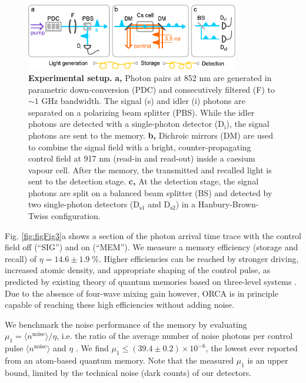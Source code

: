 \documentclass[12pt]{iopart}
\begin{document}
\begin{figure}[h!]
\centering
\includegraphics[width=0.83\textwidth, right]{Fig2SET2.pdf}
\caption{\textbf{Experimental setup.} \textbf{a,} Photon pairs at 852 nm are generated in parametric down-conversion (PDC) and consecutively filtered (F) to $\sim1$ GHz bandwidth. The signal (s) and idler (i) photons are separated on a polarizing beam splitter (PBS). While the idler photons are detected with a single-photon detector ($\mathrm{D_i}$), the signal photons are sent to the memory. \textbf{b, } Dichroic mirrors (DM) are used to combine the signal field with a bright, counter-propagating control field at 917 nm (read-in and read-out) inside a caesium vapour cell. After the memory, the transmitted and recalled light is sent to the detection stage. \textbf{c, } At the detection stage, the signal photons are split on a balanced beam splitter (BS) and detected by two single-photon detectors ($\mathrm{D_{s1}}$ and $\mathrm{D_{s2}}$) in a Hanbury-Brown-Twiss configuration.}
\label{fig:figFig2}
\end{figure}

Fig. \ref{fig:figFig3}a shows a section of the photon arrival time trace with the control field off (``SIG'') and on (``MEM''). We measure a memory efficiency (storage and recall) of $\eta=14.6\pm1.9\;\%$. Higher efficiencies can be reached by stronger driving, increased atomic density, and appropriate shaping of the control pulse, as predicted by existing theory of quantum memories based on three-level systems \cite{Nunn2007,Novikova2007,Gorshkov2007}. Due to the absence of four-wave mixing gain \cite{Thomas2016} however, ORCA is in principle capable of reaching these high efficiencies without adding noise.

We benchmark the noise performance of the memory by evaluating $\mu_1=\langle n^\mathrm{noise}\rangle/\eta$, i.e. the ratio of the average number of noise photons per control pulse $\langle n^\mathrm{noise}\rangle$ and $\eta$ \cite{Gundogan2015}. We find $\mu_1\leq(39.4\pm0.2)\times10^{-6}$, the lowest ever reported from an atom-based quantum memory. Note that the measured $\mu_1$ is an upper bound, limited by the technical noise (dark counts) of our detectors.
\end{document}
